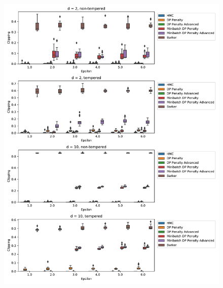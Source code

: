 \documentclass[english,twoside,openright]{HYgraduMLDS}
\begin{document}
\begin{figure}
  \centering
  \includegraphics[width=\textwidth]{figures/banana_clipping.pdf}

  \label{banana_clipping_fig}
\end{figure}
\end{document}
